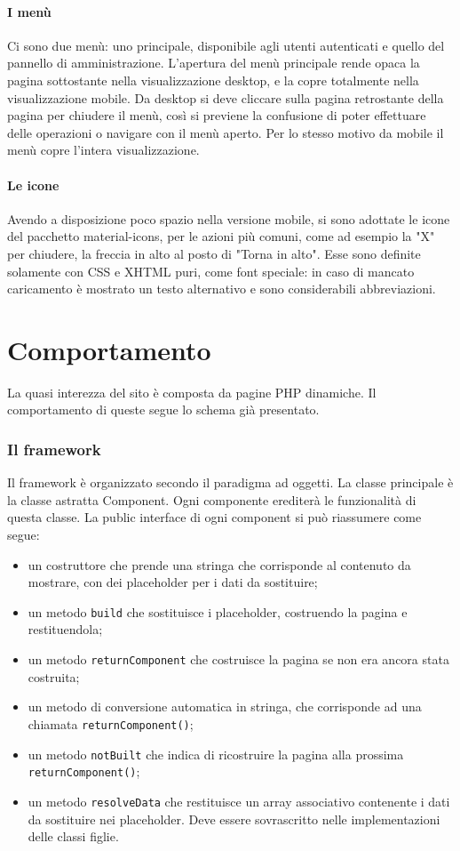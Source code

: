 \documentclass[12pt, a4paper]{article}
\begin{document}
\paragraph{I menù} Ci sono due menù: uno principale, disponibile agli utenti autenticati e quello del pannello di amministrazione. L'apertura del menù principale rende opaca la pagina sottostante nella visualizzazione desktop, e la copre totalmente nella visualizzazione mobile. Da desktop si deve cliccare sulla pagina retrostante della pagina per chiudere il menù, così si previene la confusione di poter effettuare delle operazioni o navigare con il menù aperto. Per lo stesso motivo da mobile il menù copre l'intera visualizzazione.
\paragraph{Le icone} Avendo a disposizione poco spazio nella versione mobile, si sono adottate le icone del pacchetto material-icons, per le azioni più comuni, come ad esempio la "X" per chiudere, la freccia in alto al posto di "Torna in alto". Esse sono definite solamente con CSS e XHTML puri, come font speciale: in caso di mancato caricamento è mostrato un testo alternativo e sono considerabili abbreviazioni. 
\section{Comportamento}
La quasi interezza del sito è composta da pagine PHP dinamiche. Il comportamento di queste segue lo schema già presentato.
\subsubsection{Il framework}
Il framework è organizzato secondo il paradigma ad oggetti. La classe principale è la classe astratta Component. Ogni componente erediterà le funzionalità di questa classe. La public interface di ogni component si può riassumere come segue:
\begin{itemize}
\item un costruttore che prende una stringa che corrisponde al contenuto da mostrare, con dei placeholder per i dati da sostituire;
\item un metodo \texttt{build} che sostituisce i placeholder, costruendo la pagina e restituendola;
\item un metodo \texttt{returnComponent} che costruisce la pagina se non era ancora stata costruita;
\item un metodo di conversione automatica in stringa, che corrisponde ad una chiamata \texttt{returnComponent()};
\item un metodo \texttt{notBuilt} che indica di ricostruire la pagina alla prossima \texttt{returnComponent()};
\item un metodo \texttt{resolveData} che restituisce un array associativo contenente i dati da sostituire nei placeholder. Deve essere sovrascritto nelle implementazioni delle classi figlie.
\end{itemize}
\end{document}
